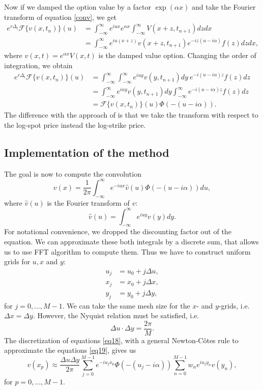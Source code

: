 Now if we damped the option value by a factor $\exp(\alpha x)$ and take the Fourier transform of equation \eqref{conv}, we get
\begin{align*}
e^{r\Delta_t}\mathcal{F}\{v(x,t_n)\}(u) &= \int_{-\infty}^\infty e^{iux} e^{\alpha x} \int_{-\infty}^\infty V(x+z,t_{n+1})dzdx \\
&= \int_{-\infty}^\infty e^{iu(x+z)}v(x+z,t_{n+1})e^{-iz(u-i\alpha)}f(z)dzdx,
\end{align*}
where $v(x,t) = e^{\alpha x}V(x,t)$ is the damped value option. Changing the order of integration, we obtain
\begin{align*}
e^{r\Delta_t}\mathcal{F}\{v(x,t_n)\}(u) &= \int_{-\infty}^\infty\int_{-\infty}^\infty e^{iuy}v(y,t_{n+1})dy~e^{-i(u-i\alpha) z}f(z)dz\\
&= \int_{-\infty}^\infty e^{iuy}v(y,t_{n+1})dy \int_{-\infty}^\infty e^{-i(u-i\alpha)z}f(z)dz \\
&= \mathcal{F}\{v(x,t_n)\}(u)\Phi(-(u-i\alpha)).
\end{align*}
The difference with the approach of \citeauthor{CM99} \citeyearpar{CM99} is that we take the transform with respect to the log-spot price instead the log-strike price.

\subsection{Implementation of the method}
The goal is now to compute the convolution 
\begin{equation}\label{eq18}
v(x) = \frac{1}{2\pi}\int_{-\infty}^\infty e^{-iux}\hat{v}(u)\Phi(-(u-i\alpha))du,
\end{equation}
where $\hat{v}(u)$ is the Fourier transform of $v$:
\begin{equation}\label{eq19}
\hat{v}(u) = \int_{-\infty}^\infty e^{iuy}v(y)dy.
\end{equation}
For notational convenience, we dropped the discounting factor out of the equation. We can approximate these both integrals by a discrete sum, that allows us to use FFT algorithm to compute them. Thus we have to construct uniform grids for $u,x$ and $y$:
\begin{align*}
u_j &= u_0 + j\Delta u,\\
x_j &= x_0 + j\Delta x,\\
y_j &= y_0 +j\Delta y,
\end{align*}
for $j = 0,\ldots,M-1$. We can take the same mesh size for the $x$- and $y$-grids, i.e. $\Delta x = \Delta y$. However, the Nyquist relation must be satisfied, i.e.
$$\Delta u \cdot \Delta y = \frac{2\pi}{M}.$$
The discretization of equations \eqref{eq18}, with a general Newton-C\^otes rule to approximate the equations \eqref{eq19}, gives us
$$v(x_p)\approx\frac{\Delta u \Delta y}{2\pi}\sum_{j=0}^{M-1}e^{-iu_jx_p}\Phi(-(u_j-i\alpha))\sum_{n=0}^{M-1}w_ne^{iu_jy_n}v(y_n),$$
for $p=0,\ldots,M-1$. 

